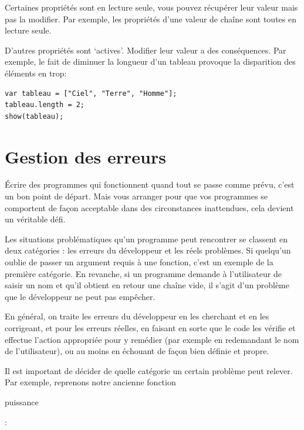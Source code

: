\documentclass{FramateX}
\renewcommand{\texttt}[1]{\begin{sffamily}{#1}\end{sffamily}}
\begin{document}
\begin{center}\end{center}

Certaines propriétés sont en lecture seule, vous pouvez récupérer leur
valeur mais pas la modifier. Par exemple, les propriétés d'une valeur de
chaîne sont toutes en lecture seule.

D'autres propriétés sont `actives'. Modifier leur valeur a des
conséquences. Par exemple, le fait de diminuer la longueur d'un tableau
provoque la disparition des éléments en trop:

\begin{lstlisting}
var tableau = ["Ciel", "Terre", "Homme"];
tableau.length = 2;
show(tableau);
\end{lstlisting}

\chapter{Gestion des erreurs}

Écrire des programmes qui fonctionnent quand tout se passe comme prévu,
c'est un bon point de départ. Mais vous arranger pour que vos programmes
se comportent de façon acceptable dans des circonstances inattendues,
cela devient un véritable défi.

Les situations problématiques qu'un programme peut rencontrer se
classent en deux catégories : les erreurs du développeur et les réels
problèmes. Si quelqu'un oublie de passer un argument requis à une
fonction, c'est un exemple de la première catégorie. En revanche, si un
programme demande à l'utilisateur de saisir un nom et qu'il obtient en
retour une chaîne vide, il s'agit d'un problème que le développeur ne
peut pas empêcher.

En général, on traite les erreurs du développeur en les cherchant et en
les corrigeant, et pour les erreurs réelles, en faisant en sorte que le
code les vérifie et effectue l'action appropriée pour y remédier (par
exemple en redemandant le nom de l'utilisateur), ou au moins en échouant
de façon bien définie et propre.

\begin{center}\end{center}

Il est important de décider de quelle catégorie un certain problème peut
relever. Par exemple, reprenons notre ancienne fonction
\texttt{puissance} :
\end{document}

